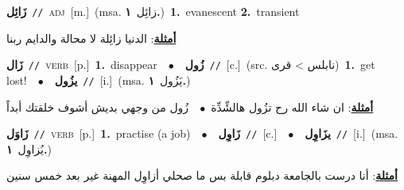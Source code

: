\documentclass[10pt,a4paper,twoside]{article} %
\begin{document}
\begin{multicols}{2}
{\setlength\topsep{0pt}\textbf{\foreignlanguage{arabic}{زَائِل}}\ {\color{gray}\texttt{//}\color{black}}\ \textsc{adj}\ [m.]\ \color{gray}(msa. \foreignlanguage{arabic}{زائِل}~\foreignlanguage{arabic}{\textbf{١.}})\color{black}\ \textbf{1.}~evanescent  \textbf{2.}~transient\  \begin{flushright}\color{gray}\foreignlanguage{arabic}{\textbf{\underline{\foreignlanguage{arabic}{أمثلة}}}: الدنيا زائِلة لا محالة والدايم ربنا}\end{flushright}\color{black}} \vspace{2mm}

{\setlength\topsep{0pt}\textbf{\foreignlanguage{arabic}{زَال}}\ {\color{gray}\texttt{//}\color{black}}\ \textsc{verb}\ [p.]\ \textbf{1.}~disappear\ \ $\bullet$\ \ \setlength\topsep{0pt}\textbf{\foreignlanguage{arabic}{زُول}}\ {\color{gray}\texttt{//}\color{black}}\ [c.]\ (src. \color{gray}\foreignlanguage{arabic}{نابلس > قرى}\color{black})\ \textbf{1.}~get lost!\ \ $\bullet$\ \ \setlength\topsep{0pt}\textbf{\foreignlanguage{arabic}{يزُول}}\ {\color{gray}\texttt{//}\color{black}}\ [i.]\ \color{gray}(msa. \foreignlanguage{arabic}{يَزُول}~\foreignlanguage{arabic}{\textbf{١.}})\color{black}\  \begin{flushright}\color{gray}\foreignlanguage{arabic}{\textbf{\underline{\foreignlanguage{arabic}{أمثلة}}}: ان شاء الله رح تزُول هالشِّدِّة\ $\bullet$\ \  زُول من وجهي بديش أشوف خلقتك أبداً}\end{flushright}\color{black}} \vspace{2mm}

{\setlength\topsep{0pt}\textbf{\foreignlanguage{arabic}{زَاوَل}}\ {\color{gray}\texttt{//}\color{black}}\ \textsc{verb}\ [p.]\ \textbf{1.}~practise (a job)\ \ $\bullet$\ \ \setlength\topsep{0pt}\textbf{\foreignlanguage{arabic}{زَاوِل}}\ {\color{gray}\texttt{//}\color{black}}\ [c.]\ \ $\bullet$\ \ \setlength\topsep{0pt}\textbf{\foreignlanguage{arabic}{يزَاوِل}}\ {\color{gray}\texttt{//}\color{black}}\ [i.]\ \color{gray}(msa. \foreignlanguage{arabic}{يُزاوِل}~\foreignlanguage{arabic}{\textbf{١.}})\color{black}\  \begin{flushright}\color{gray}\foreignlanguage{arabic}{\textbf{\underline{\foreignlanguage{arabic}{أمثلة}}}: أنا درست بالجامعة دبلوم قابلة بس ما صحلي أزاوِل المهنة غير بعد خمس سنين}\end{flushright}\color{black}} \vspace{2mm}


\end{multicols}
\end{document}
